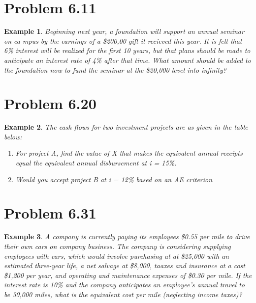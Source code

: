 \documentclass{report} %
\newtheorem{exmp}{Example}
\begin{document}
\section*{Problem 6.11}
\begin{exmp}
    Beginning next year, a foundation will support an annual seminar on ca mpus by the earnings of a \$200,00 gift it recieved this year. It is felt that 6\% interest will be realized for the first 10 years, but that plans should be made to anticipate an interest rate of 4\% after that time. What amount should be added to the foundation now to fund the seminar at the \$20,000 level into infinity?
\end{exmp}

\section*{Problem 6.20}
\begin{exmp}
    The cash flows for two investment projects are as given in the table below:
    \begin{enumerate}
        \item For project A, find the value of X that makes the equivalent annual receipts equal the equivalent annual disbursement at i = 15\%.
        \item Would you accept project B at i = 12\% based on an AE criterion
    \end{enumerate}
\end{exmp}

\section*{Problem 6.31}
\begin{exmp}
    A company is currently paying its employees \$0.55 per mile to drive their own cars on company business. The company is considering supplying employees with cars, which would involve purchasing at at \$25,000 with an estimated three-year life, a net salvage at \$8,000, taaxes and insurance at a cost \$1,200 per year, and operating and maintenance expenses of \$0.30 per mile. If the interest rate is 10\% and the company anticipates an employee's annual travel to be 30,000 miles, what is the equivalent cost per mile (neglecting income taxes)?
\end{exmp}
\end{document}
